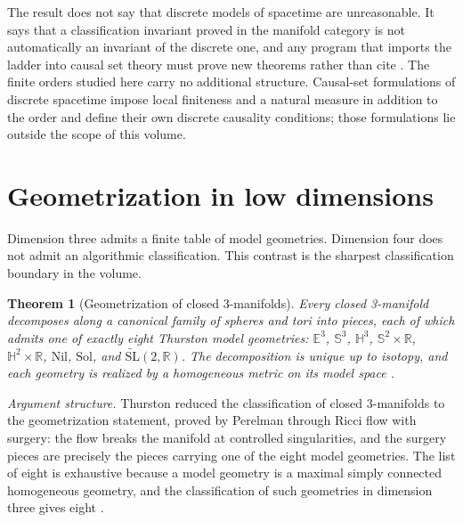 \documentclass[11pt,letterpaper]{article}
\newtheorem{theorem}{Theorem}[section]
\theoremstyle{definition}
\theoremstyle{remark}
\begin{document}
The result does not say that discrete models of spacetime are unreasonable. It says that a classification invariant proved in the manifold category is not automatically an invariant of the discrete one, and any program that imports the ladder into causal set theory must prove new theorems rather than cite \cite{minguzzisanchez}. The finite orders studied here carry no additional structure. Causal-set formulations of discrete spacetime impose local finiteness and a natural measure in addition to the order and define their own discrete causality conditions; those formulations lie outside the scope of this volume.

\section{Geometrization in low dimensions}

Dimension three admits a finite table of model geometries. Dimension four does not admit an algorithmic classification. This contrast is the sharpest classification boundary in the volume.

\begin{theorem}[Geometrization of closed 3-manifolds]\label{thm:geometrization}
Every closed 3-manifold decomposes along a canonical family of spheres and tori into pieces, each of which admits one of exactly eight Thurston model geometries: $\mathbb{E}^3$, $\mathbb{S}^3$, $\mathbb{H}^3$, $\mathbb{S}^2 \times \mathbb{R}$, $\mathbb{H}^2 \times \mathbb{R}$, $\mathrm{Nil}$, $\mathrm{Sol}$, and $\widetilde{\mathrm{SL}}(2, \mathbb{R})$. The decomposition is unique up to isotopy, and each geometry is realized by a homogeneous metric on its model space \cite{perelman,thurston1982}.
\end{theorem}

\par\medskip\noindent\emph{Argument structure.}
Thurston reduced the classification of closed 3-manifolds to the geometrization statement, proved by Perelman through Ricci flow with surgery: the flow breaks the manifold at controlled singularities, and the surgery pieces are precisely the pieces carrying one of the eight model geometries. The list of eight is exhaustive because a model geometry is a maximal simply connected homogeneous geometry, and the classification of such geometries in dimension three gives eight \cite{thurston1982,perelman}.
\par\medskip
\end{document}
